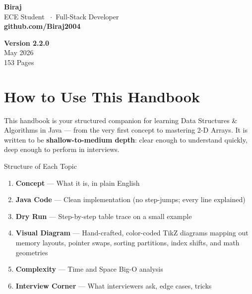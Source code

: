 \documentclass[12pt,a4paper,oneside]{book}
\begin{document}
\begin{titlepage}
\begin{minipage}{0.82\textwidth}
  \begin{minipage}{0.52\textwidth}
    {\LARGE\bfseries\color{black} Biraj}\\[4pt]
    {\normalsize\color{black!70} ECE Student \ $\cdot$\ Full-Stack Developer}\\[4pt]
    {\normalsize\bfseries\color{myred} github.com/Biraj2004}
  \end{minipage}%
  \hfill
  \begin{minipage}{0.40\textwidth}\raggedleft
    {\normalsize\bfseries\color{black} Version 2.2.0}\\[4pt]
    {\normalsize\color{black!65} May 2026}\\[4pt]
    {\normalsize\color{black!65} 153 Pages}
  \end{minipage}

  \vspace{0.6cm}

\end{minipage}

\end{titlepage}
\nopagecolor

\frontmatter
\tableofcontents
\clearpage

\chapter*{How to Use This Handbook}

This handbook is your structured companion for learning Data Structures \& Algorithms in Java --- from the very first concept to mastering 2-D Arrays. It is written to be \textbf{shallow-to-medium depth}: clear enough to understand quickly, deep enough to perform in interviews.

\begin{definitionbox}{Structure of Each Topic}
\begin{enumerate}
  \item \textbf{Concept} --- What it is, in plain English
  \item \textbf{Java Code} --- Clean implementation (no step-jumps; every line explained)
  \item \textbf{Dry Run} --- Step-by-step table trace on a small example
  \item \textbf{Visual Diagram} --- Hand-crafted, color-coded TikZ diagrams mapping out memory layouts, pointer swaps, sorting partitions, index shifts, and math geometries
  \item \textbf{Complexity} --- Time and Space Big-O analysis
  \item \textbf{Interview Corner} --- What interviewers ask, edge cases, tricks
\end{enumerate}
\end{definitionbox}
\end{document}
